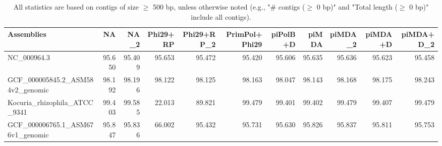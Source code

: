 \documentclass[12pt,a4paper]{article}
\begin{document}
\begin{table}[ht]
\begin{center}
\caption{All statistics are based on contigs of size $\geq$ 500 bp, unless otherwise noted (e.g., "\# contigs ($\geq$ 0 bp)" and "Total length ($\geq$ 0 bp)" include all contigs).}
\begin{tabular}{|l*{10}{|r}|}
\hline
Assemblies & NA & NA\_2 & Phi29+RP & Phi29+RP\_2 & PrimPol+Phi29 & piPolB+D & piMDA & piMDA\_2 & piMDA+D & piMDA+D\_2 \\ \hline
NC\_000964.3 & 95.650 & 95.409 & 95.653 & 95.472 & 95.420 & 95.606 & 95.635 & 95.636 & 95.623 & 95.458 \\ \hline
GCF\_000005845.2\_ASM584v2\_genomic & 98.192 & 98.196 & 98.122 & 98.125 & 98.163 & 98.047 & 98.143 & 98.168 & 98.175 & 98.243 \\ \hline
Kocuria\_rhizophila\_ATCC\_9341 & 99.403 & 99.585 & 22.013 & 89.821 & 99.479 & 99.401 & 99.402 & 99.479 & 99.407 & 99.479 \\ \hline
GCF\_000006765.1\_ASM676v1\_genomic & 95.847 & 95.836 & 66.002 & 95.432 & 95.731 & 95.630 & 95.826 & 95.837 & 95.811 & 95.753 \\ \hline
\end{tabular}
\end{center}
\end{table}
\end{document}
